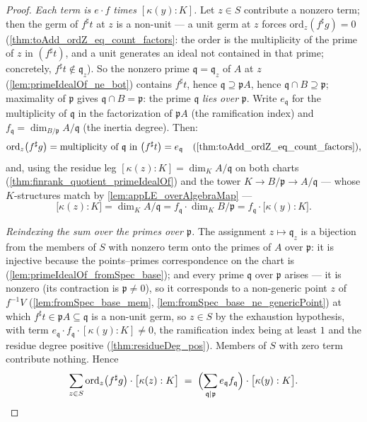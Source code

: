 \begin{proof}
  \emph{Each term is \(e \cdot f\) times \([\kappa(y):K]\).} Let \(z \in S\) contribute
  a nonzero term; then the germ of \(f^{\sharp}t\) at \(z\) is a non-unit --- a unit
  germ at \(z\) forces \(\mathrm{ord}_z(f^{\sharp}g) = 0\)
  (\ref{thm:toAdd_ordZ_eq_count_factors}: the order is the multiplicity of the prime of
  \(z\) in \((f^{\sharp}t)\), and a unit generates an ideal not contained in that
  prime; concretely, \(f^{\sharp}t \notin \mathfrak q_z\)). So the nonzero prime
  \(\mathfrak q = \mathfrak q_z\) of \(A\) at \(z\) (\ref{lem:primeIdealOf_ne_bot})
  contains \(f^{\sharp}t\), hence \(\mathfrak q \supseteq \mathfrak p A\), hence
  \(\mathfrak q \cap B \supseteq \mathfrak p\); maximality of \(\mathfrak p\) gives
  \(\mathfrak q \cap B = \mathfrak p\): the prime \(\mathfrak q\) \emph{lies over}
  \(\mathfrak p\). Write \(e_{\mathfrak q}\) for the multiplicity of \(\mathfrak q\) in
  the factorization of \(\mathfrak p A\) (the ramification index) and
  \(f_{\mathfrak q} = \dim_{B/\mathfrak p} A/\mathfrak q\) (the inertia degree). Then:
  \[
    \mathrm{ord}_z\bigl(f^{\sharp}g\bigr)
      = \text{multiplicity of } \mathfrak q \text{ in } \bigl(f^{\sharp}t\bigr)
      = e_{\mathfrak q}
    \quad (\ref{thm:toAdd_ordZ_eq_count_factors}),
  \]
  and, using the residue leg \([\kappa(z) : K] = \dim_K A/\mathfrak q\) on both charts
  (\ref{thm:finrank_quotient_primeIdealOf}) and the tower
  \(K \to B/\mathfrak p \to A/\mathfrak q\) --- whose \(K\)-structures match by
  \ref{lem:appLE_overAlgebraMap} ---
  \[
    \bigl[\kappa(z) : K\bigr] = \dim_K A/\mathfrak q
      = f_{\mathfrak q} \cdot \dim_K B/\mathfrak p
      = f_{\mathfrak q} \cdot \bigl[\kappa(y) : K\bigr].
  \]

  \emph{Reindexing the sum over the primes over \(\mathfrak p\).} The assignment
  \(z \mapsto \mathfrak q_z\) is a bijection from the members of \(S\) with nonzero
  term onto the primes of \(A\) over \(\mathfrak p\): it is injective because the
  points--primes correspondence on the chart is
  (\ref{lem:primeIdealOf_fromSpec_base}); and every prime \(\mathfrak q\) over
  \(\mathfrak p\) arises --- it is nonzero (its contraction is \(\mathfrak p \neq 0\)),
  so it corresponds to a non-generic point \(z\) of \(f^{-1}V\)
  (\ref{lem:fromSpec_base_mem}, \ref{lem:fromSpec_base_ne_genericPoint}) at which
  \(f^{\sharp}t \in \mathfrak p A \subseteq \mathfrak q\) is a non-unit germ, so
  \(z \in S\) by the exhaustion hypothesis, with term
  \(e_{\mathfrak q} \cdot f_{\mathfrak q} \cdot [\kappa(y):K] \neq 0\), the
  ramification index being at least \(1\) and the residue degree positive
  (\ref{thm:residueDeg_pos}). Members of \(S\) with zero term contribute nothing.
  Hence
  \[
    \sum_{z \in S} \mathrm{ord}_z\bigl(f^{\sharp}g\bigr) \cdot
      \bigl[\kappa(z) : K\bigr]
    \;=\; \Bigl(\sum_{\mathfrak q \mid \mathfrak p}
      e_{\mathfrak q} f_{\mathfrak q}\Bigr) \cdot \bigl[\kappa(y) : K\bigr].
  \]


\end{proof}
